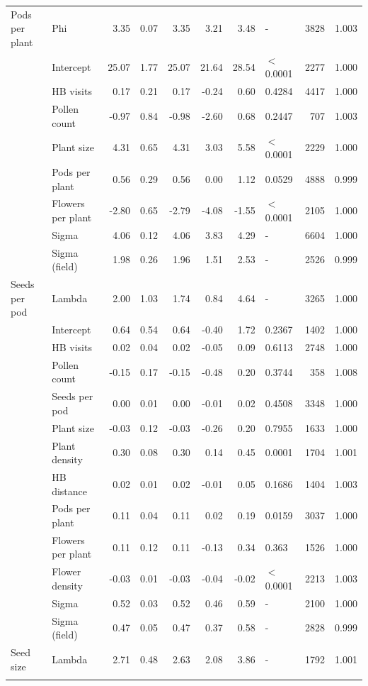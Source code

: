 \begin{longtable}{l|l|r|r|r|r|r|l|r|r}
\cline{2-10}
\multirow{-6}{*}{\raggedright\arraybackslash Pods per plant} & Phi & 3.35 & 0.07 & 3.35 & 3.21 & 3.48 & - & 3828 & 1.003\\
\cline{1-10}
 & Intercept & 25.07 & 1.77 & 25.07 & 21.64 & 28.54 & $<$0.0001 & 2277 & 1.000\\
\cline{2-10}
 & HB visits & 0.17 & 0.21 & 0.17 & -0.24 & 0.60 & 0.4284 & 4417 & 1.000\\
\cline{2-10}
 & Pollen count & -0.97 & 0.84 & -0.98 & -2.60 & 0.68 & 0.2447 & 707 & 1.003\\
\cline{2-10}
 & Plant size & 4.31 & 0.65 & 4.31 & 3.03 & 5.58 & $<$0.0001 & 2229 & 1.000\\
\cline{2-10}
 & Pods per plant & 0.56 & 0.29 & 0.56 & 0.00 & 1.12 & 0.0529 & 4888 & 0.999\\
\cline{2-10}
 & Flowers per plant & -2.80 & 0.65 & -2.79 & -4.08 & -1.55 & $<$0.0001 & 2105 & 1.000\\
\cline{2-10}
 & Sigma & 4.06 & 0.12 & 4.06 & 3.83 & 4.29 & - & 6604 & 1.000\\
\cline{2-10}
 & Sigma (field) & 1.98 & 0.26 & 1.96 & 1.51 & 2.53 & - & 2526 & 0.999\\
\cline{2-10}
\multirow{-9}{*}{\raggedright\arraybackslash Seeds per pod} & Lambda & 2.00 & 1.03 & 1.74 & 0.84 & 4.64 & - & 3265 & 1.000\\
\cline{1-10}
 & Intercept & 0.64 & 0.54 & 0.64 & -0.40 & 1.72 & 0.2367 & 1402 & 1.000\\
\cline{2-10}
 & HB visits & 0.02 & 0.04 & 0.02 & -0.05 & 0.09 & 0.6113 & 2748 & 1.000\\
\cline{2-10}
 & Pollen count & -0.15 & 0.17 & -0.15 & -0.48 & 0.20 & 0.3744 & 358 & 1.008\\
\cline{2-10}
 & Seeds per pod & 0.00 & 0.01 & 0.00 & -0.01 & 0.02 & 0.4508 & 3348 & 1.000\\
\cline{2-10}
 & Plant size & -0.03 & 0.12 & -0.03 & -0.26 & 0.20 & 0.7955 & 1633 & 1.000\\
\cline{2-10}
 & Plant density & 0.30 & 0.08 & 0.30 & 0.14 & 0.45 & 0.0001 & 1704 & 1.001\\
\cline{2-10}
 & HB distance & 0.02 & 0.01 & 0.02 & -0.01 & 0.05 & 0.1686 & 1404 & 1.003\\
\cline{2-10}
 & Pods per plant & 0.11 & 0.04 & 0.11 & 0.02 & 0.19 & 0.0159 & 3037 & 1.000\\
\cline{2-10}
 & Flowers per plant & 0.11 & 0.12 & 0.11 & -0.13 & 0.34 & 0.363 & 1526 & 1.000\\
\cline{2-10}
 & Flower density & -0.03 & 0.01 & -0.03 & -0.04 & -0.02 & $<$0.0001 & 2213 & 1.003\\
\cline{2-10}
 & Sigma & 0.52 & 0.03 & 0.52 & 0.46 & 0.59 & - & 2100 & 1.000\\
\cline{2-10}
 & Sigma (field) & 0.47 & 0.05 & 0.47 & 0.37 & 0.58 & - & 2828 & 0.999\\
\cline{2-10}
\multirow{-13}{*}{\raggedright\arraybackslash Seed size} & Lambda & 2.71 & 0.48 & 2.63 & 2.08 & 3.86 & - & 1792 & 1.001\\
\hline
\label{tab:commCoefs}
\end{longtable}
\endgroup{}

